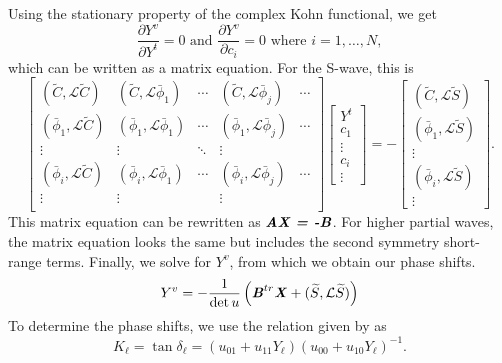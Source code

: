 \documentclass[preprint,showpacs,preprintnumbers,amsmath,amssymb]{revtex4}
\newcommand{\beq}{\begin{equation}}
\newcommand{\eeq}{\end{equation}}
\begin{document}
Using the stationary property of the complex Kohn functional, we get
\beq
\frac{\partial Y^v}{\partial Y^t} = 0  \text{ and } \frac{\partial Y^v}{\partial c_i} = 0 \text{ where $i = 1,\ldots,N$},
\label{eq:ComplexKohnStationary}
\eeq
which can be written as a matrix equation. For the S-wave, this is
\begin{equation}
\label{eq:ComplexKohnMatrix}
\begin{bmatrix} 
 (\widetilde{C},\mathcal{L}\widetilde{C}) & (\widetilde{C},\mathcal{L}\bar{\phi}_1) & \cdots & (\widetilde{C},\mathcal{L}\bar{\phi}_j) & \cdots\\
 (\bar{\phi}_1,\mathcal{L}\widetilde{C}) & (\bar{\phi}_1,\mathcal{L}\bar{\phi}_1) & \cdots & (\bar{\phi}_1,\mathcal{L}\bar{\phi}_j) & \cdots\\
 \vdots & \vdots & \ddots & \vdots \\
 (\bar{\phi}_i,\mathcal{L}\widetilde{C}) & (\bar{\phi}_i,\mathcal{L}\bar{\phi}_1) & \cdots & (\bar{\phi}_i,\mathcal{L}\bar{\phi}_j) & \cdots\\
 \vdots & \vdots & & \vdots & \\
\end{bmatrix}
\begin{bmatrix}
Y^t\\
c_1\\
\vdots\\
c_i\\
\vdots
\end{bmatrix}
= -
\begin{bmatrix}
(\widetilde{C},\mathcal{L}\widetilde{S}) \\
(\bar{\phi}_1,\mathcal{L}\widetilde{S}) \\
\vdots \\
(\bar{\phi}_i,\mathcal{L}\widetilde{S}) \\
\vdots
\end{bmatrix}.
\end{equation}
This matrix equation can be rewritten as $\textbf{\emph{AX = -B}}$. For higher partial waves, the matrix equation looks the same but includes the second symmetry short-range terms. Finally, we solve for $Y^v$, from which we obtain our phase shifts.
\begin{equation}
Y^v = -\frac{1}{\det u} \left( \textbf{\emph{B}}^{tr} \textbf{\emph{X}} + (\widetilde{S},\mathcal{L} \widetilde{S}) \right)
\end{equation}
To determine the phase shifts, we use the relation given by \cite{Lucchese1989} as
\begin{equation}
K_\ell = \tan \delta_\ell = (u_{01} + u_{11} Y_\ell)(u_{00} + u_{10} Y_\ell)^{-1}.
\end{equation}
\end{document}
